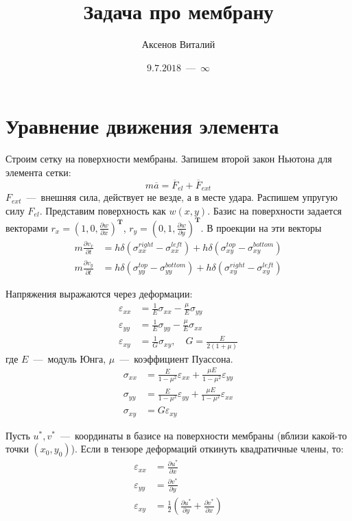 \documentclass[12pt,a4paper,fleqn]{article}
\title{Задача про мембрану}
\author{Аксенов Виталий}
\date{$9.7.2018$~---~$\infty$}
\begin{document}
\maketitle
\thispagestyle{empty}



\section{Уравнение движения элемента}
Строим сетку на поверхности мембраны. Запишем второй закон Ньютона для элемента сетки:
\begin{equation}
	m\overline{a} = \overline{F}_{el} + \overline{F}_{ext}
\end{equation}
$F_{ext}$~---~внешняя сила, действует не везде, а в месте удара.
Распишем упругую силу $F_{el}$.
Представим поверхность как $w(x,y)$. Базис на поверхности задается векторами $r_x=(1, 0, \frac{\partial w}{\partial x})^\mathbf{T}$,  $r_y=(0, 1, \frac{\partial w}{\partial y})^\mathbf{T}$.
В проекции на эти векторы
\begin{align}
	m\frac{\partial v_x}{\partial t} &= h\delta(\sigma_{xx}^{right} - \sigma_{xx}^{left}) + h\delta(\sigma_{xy}^{top} - \sigma_{xy}^{bottom}) \\
	m\frac{\partial v_y}{\partial t} &= h\delta(\sigma_{yy}^{top} - \sigma_{yy}^{bottom}) + h\delta(\sigma_{xy}^{right} - \sigma_{xy}^{left})
\end{align}

Напряжения выражаются через деформации:
\begin{align}
	\varepsilon_{xx} &= \frac{1}{E}\sigma_{xx} -\frac{\mu}{E}\sigma_{yy} \\
	\varepsilon_{yy} &= \frac{1}{E}\sigma_{yy} -\frac{\mu}{E}\sigma_{xx} \\
	\varepsilon_{xy} &= \frac{1}{G}\sigma_{xy}, \quad G = \frac{E}{2(1 + \mu)}
\end{align}
где $E$~---~модуль Юнга, $\mu$~---~коэффициент Пуассона.
\begin{align}
	\sigma_{xx} &= \frac{E}{1 - \mu^2}\varepsilon_{xx} + \frac{\mu E}{1 - \mu^2}\varepsilon_{yy} \\
	\sigma_{yy} &= \frac{E}{1 - \mu^2}\varepsilon_{yy} + \frac{\mu E}{1 - \mu^2}\varepsilon_{xx} \\
	\sigma_{xy} &= G\varepsilon_{xy}
\end{align}

Пусть $u^*, v^*$~---~координаты в базисе на поверхности мембраны (вблизи какой-то точки $(x_0, y_0)$). Если в тензоре деформаций откинуть квадратичные члены, то:
\begin{align}
	\varepsilon_{xx} &= \frac{\partial u^*}{\partial x} \\
	\varepsilon_{yy} &= \frac{\partial v^*}{\partial y} \\
	\varepsilon_{xy} &= \frac{1}{2} \left( \frac{\partial u^*}{\partial y} + \frac{\partial v^*}{\partial x}  \right)
\end{align}
\end{document}
